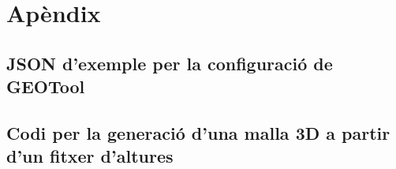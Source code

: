 \documentclass[10pt,a4paper,twocolumn,twoside]{article}
\begin{document}
\newpage
\appendix

\section*{Apèndix}

\setcounter{section}{1}

\subsection{JSON d'exemple per la configuració de GEOTool}
\label{appendix:geotoolconfig}


\subsection{Codi per la generació d'una malla 3D a partir d'un fitxer d'altures}
\label{appendix:generateobj}

\end{document}
